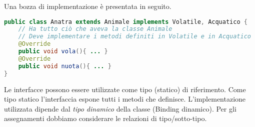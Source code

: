 \documentclass{article}
\begin{document}
Una bozza di implementazione \`e presentata in seguito.
\begin{lstlisting}[language=Java,escapechar=|]
public class Anatra extends Animale implements Volatile, Acquatico { 
    // Ha tutto ciò che aveva la classe Animale
    // Deve implementare i metodi definiti in Volatile e in Acquatico 
    @Override
    public void vola(){ ... }
    @Override
    public void nuota(){ ... } 
}
\end{lstlisting}
Le interfacce possono essere utilizzate come tipo (statico) di riferimento. Come tipo statico l'interfaccia espone tutti i metodi che definisce.
L'implementazione utilizzata dipende dal \emph{tipo dinamico} della classe (Binding dinamico). Per gli assegnamenti dobbiamo considerare le relazioni di tipo/sotto-tipo.
\end{document}
